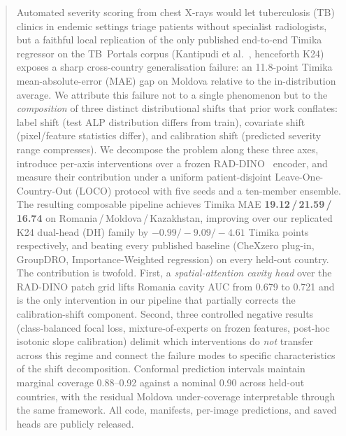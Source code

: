 \documentclass[runningheads]{llncs}
\begin{document}
\begin{abstract}
Automated severity scoring from chest X-rays would let tuberculosis (TB) clinics in endemic settings triage patients without specialist radiologists, but a faithful local replication of the only published end-to-end Timika regressor on the TB~Portals corpus (Kantipudi et al.~\cite{kantipudi2024}, henceforth K24) exposes a sharp cross-country generalisation failure: an 11.8-point Timika mean-absolute-error (MAE) gap on Moldova relative to the in-distribution average. We attribute this failure not to a single phenomenon but to the \emph{composition} of three distinct distributional shifts that prior work conflates: label shift (test ALP distribution differs from train), covariate shift (pixel/feature statistics differ), and calibration shift (predicted severity range compresses). We decompose the problem along these three axes, introduce per-axis interventions over a frozen RAD-DINO~\cite{perez2024raddino} encoder, and measure their contribution under a uniform patient-disjoint Leave-One-Country-Out (LOCO) protocol with five seeds and a ten-member ensemble. The resulting composable pipeline achieves Timika MAE \textbf{19.12\,/\,21.59\,/\,16.74} on Romania\,/\,Moldova\,/\,Kazakhstan, improving over our replicated K24 dual-head (DH) family by $-0.99 / -9.09 / -4.61$ Timika points respectively, and beating every published baseline (CheXzero plug-in, GroupDRO, Importance-Weighted regression) on every held-out country. The contribution is twofold. First, a \emph{spatial-attention cavity head} over the RAD-DINO patch grid lifts Romania cavity AUC from 0.679 to 0.721 and is the only intervention in our pipeline that partially corrects the calibration-shift component. Second, three controlled negative results (class-balanced focal loss, mixture-of-experts on frozen features, post-hoc isotonic slope calibration) delimit which interventions do \emph{not} transfer across this regime and connect the failure modes to specific characteristics of the shift decomposition. Conformal prediction intervals maintain marginal coverage 0.88--0.92 against a nominal 0.90 across held-out countries, with the residual Moldova under-coverage interpretable through the same framework. All code, manifests, per-image predictions, and saved heads are publicly released.
\end{abstract}

\end{document}
